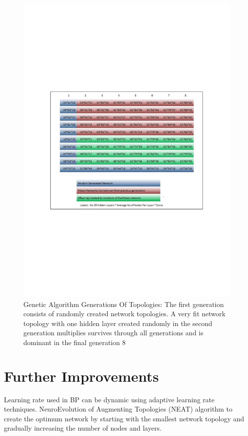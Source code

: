 \begin{figure}[h]
\centering
   \includegraphics[scale=.7]{figures/generations.pdf}
  \caption[Genetic Algorithm Generations Of Topologies]{Genetic Algorithm Generations Of Topologies: The first generation consists of randomly created network topologies. A very fit network topology with one hidden layer created randomly in the second generation multiplies survives through all generations and is dominant in the final generation 8} 
 \label{fig:Gagen}
\end{figure}

\section{Further Improvements}
Learning rate used in BP can be dynamic using adaptive learning rate techniques. NeuroEvolution of Augmenting Topologies (NEAT) algorithm  \cite{K2002} to create the optimum network by starting with the smallest network topology and gradually increasing the number of nodes and layers.

